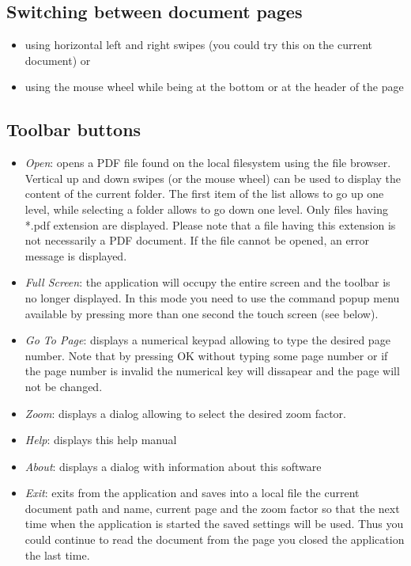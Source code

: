 \documentclass[journal,12pt]{IEEEtran}
\begin{document}
\subsection{Switching between document pages}
\begin{itemize}
 \item using horizontal left and right swipes (you could try this on the current document) or
 \item using the mouse wheel while being at the bottom or at the header of the page
\end{itemize}

\subsection{Toolbar buttons}
\begin{itemize}
 \item \textit{Open}: opens a PDF file found on the local filesystem using the file browser. Vertical up and down swipes (or the mouse wheel) can be used to display the content of the current folder. The first item of the list allows to go up one level, while selecting a folder allows to go down one level. Only files having *.pdf extension are displayed. Please note that a file having this extension is not necessarily a PDF document. If the file cannot be opened, an error message is displayed.
 \item \textit{Full Screen}: the application will occupy the entire screen and the toolbar is no longer displayed. In this mode you need to use the command popup menu available by pressing more than one second the touch screen (see below).
 \item \textit{Go To Page}: displays a numerical keypad allowing to type the desired page number. Note that by pressing OK without typing some page number or if the page number is invalid the numerical key will dissapear and the page will not be changed.
 \item \textit{Zoom}: displays a dialog allowing to select the desired zoom factor.
 \item \textit{Help}: displays this help manual
 \item \textit{About}: displays a dialog with information about this software
 \item \textit{Exit}: exits from the application and saves into a local file the current document path and name, current page and the  zoom factor so that the next time when the application is started the saved settings will be used. Thus you could continue to read the document from the page you closed the application the last time.
\end{itemize}
\end{document}
